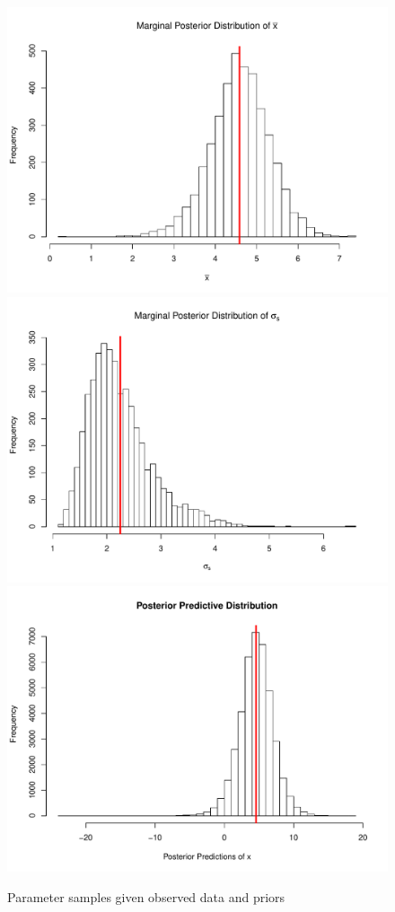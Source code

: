 \documentclass[12pt]{article}
\begin{document}
\begin{figure}[H]\caption[]{Parameter samples given observed data and priors}
\begin{minipage}{1\linewidth}
  \centering
\includegraphics[trim={0cm 0cm 0cm 0cm}, clip, scale=0.4]{../figs/norm1_mu.pdf}
\includegraphics[trim={0cm 0cm 0cm 0cm}, clip, scale=0.4]{../figs/norm1_sigma.pdf}
\includegraphics[trim={0cm 0cm 0cm 0cm}, clip, scale=0.4]{../figs/norm1_pp.pdf}

\end{minipage}
\end{figure}
\end{document}
